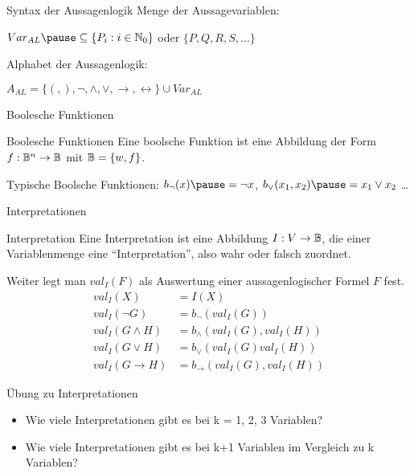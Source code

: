 \documentclass[]{beamer}
\begin{document}
\begin{frame}{Syntax der Aussagenlogik}
	\pause
	Menge der Aussagevariablen:
	
	\pause\quad $Var_{AL} \pause \subseteq \{P_i : i \in \N_0\}$ \pause oder $\{P, Q, R, S, \dots\}$
	
	\pause Alphabet der Aussagenlogik:
	
	\pause\quad $A_{AL} = \{(, ), \lnot, \land, \lor, \rightarrow, \leftrightarrow\} \cup Var_{AL}$
\end{frame}

\begin{frame}{Boolesche Funktionen}
\begin{block}{Boolesche Funktionen}
	Eine boolsche Funktion ist eine Abbildung \pause der Form $f: \mathbb{B}^n \rightarrow \mathbb{B}$ \pause mit $\mathbb{B} = \{w, f\}$.
\end{block}

Typische Boolsche Funktionen\pause : $b_\lnot (x) \pause = \lnot x$\pause , $b_\lor (x_1, x_2) \pause = x_1 \lor x_2$ \dots
\end{frame}

\begin{frame}{Interpretationen}
	\begin{block}{Interpretation}
		\pause Eine Interpretation ist eine Abbildung $I : V \rightarrow \mathbb{B}$\pause , die einer Variablenmenge eine ``Interpretation''\pause , also wahr oder falsch zuordnet.
	\end{block}

\pause Weiter legt man $val_I(F)$ als Auswertung einer aussagenlogischer Formel $F$ fest.
\pause
	\newcommand{\val}{val}
	\begin{align*}
	\val_I(X)         &= I(X) \\
	\val_I(\lnot G)   &= b_{\lnot}(\val_I(G)) \\
	\val_I(G \land H) &= b_{\land}(\val_I(G), \val_I(H)) \\
	\val_I(G \lor H)  &= b_{\lor}(\val_I(G)  \val_I(H)) \\
	\val_I(G \rightarrow H)&= b_{\rightarrow}(\val_I(G), \val_I(H))
	\end{align*}
\end{frame}

\begin{frame}{Übung zu Interpretationen}
	
	
	\begin{itemize}
		\item Wie viele Interpretationen gibt es bei k = 1, 2, 3 Variablen?
		\item Wie viele Interpretationen gibt es bei k+1 Variablen im Vergleich zu k Variablen?
	\end{itemize}
	
\end{frame}	
\end{document}
